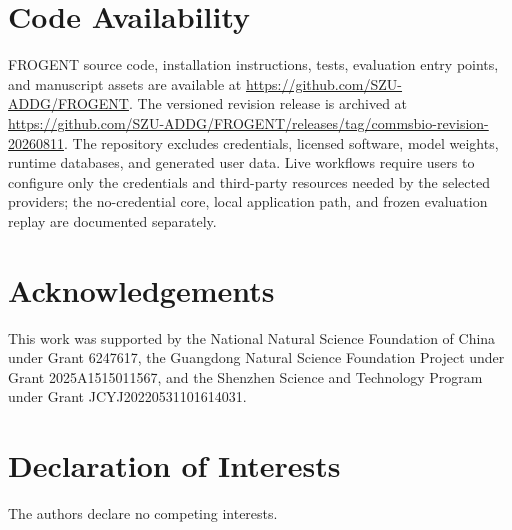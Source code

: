 \documentclass{article}
\begin{document}
\section*{Code Availability}
FROGENT source code, installation instructions, tests, evaluation entry points, and manuscript assets are available at \url{https://github.com/SZU-ADDG/FROGENT}. The versioned revision release is archived at \url{https://github.com/SZU-ADDG/FROGENT/releases/tag/commsbio-revision-20260811}. The repository excludes credentials, licensed software, model weights, runtime databases, and generated user data. Live workflows require users to configure only the credentials and third-party resources needed by the selected providers; the no-credential core, local application path, and frozen evaluation replay are documented separately.

\section*{Acknowledgements}
This work was supported by the National Natural Science Foundation of China under Grant 6247617, the Guangdong Natural Science Foundation Project under Grant 2025A1515011567, and the Shenzhen Science and Technology Program under Grant JCYJ20220531101614031.

\section*{Declaration of Interests}
The authors declare no competing interests.

\newpage
\nolinenumbers


\end{document}
